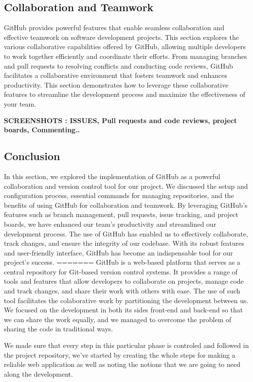   \subsection{Collaboration and Teamwork}
GitHub provides powerful features that enable seamless collaboration and effective teamwork on software development projects. This section explores the various collaborative capabilities offered by GitHub, allowing multiple developers to work together efficiently and coordinate their efforts. From managing branches and pull requests to resolving conflicts and conducting code reviews, GitHub facilitates a collaborative environment that fosters teamwork and enhances productivity. This section demonstrates how to leverage these collaborative features to streamline the development process and maximize the effectiveness of your team.   

\medskip \textbf{SCREENSHOTS : ISSUES, Pull requests and code reviews, project boards, Commenting..}
\subsection{Conclusion}
In this section, we explored the implementation of GitHub as a powerful collaboration and version control tool for our project. We discussed the setup and configuration process, essential commands for managing repositories, and the benefits of using GitHub for collaboration and teamwork. By leveraging GitHub's features such as branch management, pull requests, issue tracking, and project boards, we have enhanced our team's productivity and streamlined our development process. The use of GitHub has enabled us to effectively collaborate, track changes, and ensure the integrity of our codebase. With its robust features and user-friendly interface, GitHub has become an indispensable tool for our project's success.
=======
\medskip GitHub is a web-based platform that serves as a central repository for Git-based version control systems. It provides a range of tools and features that allow developers to collaborate on projects, manage code and track changes, and share their work with others with ease. The use of such tool facilitates the colaborative work by partitioning the development between us. We focused on the development in both its sides front-end and back-end so that we can share the work equally, and we managed to overcome the problem of sharing the code in traditional ways. 

 We made sure that every step in this particular phase is controled and followed in the project repository, we've started by creating the whole steps for making a reliable web application as well as noting the notions that we are going to need along the development. 
